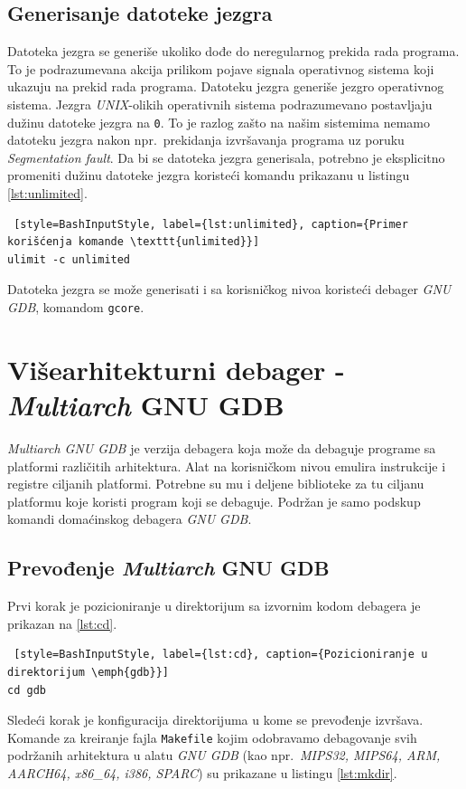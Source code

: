\documentclass[12pt,oneside]{memoir}
\begin{document}
\subsection{Generisanje datoteke jezgra}

Datoteka jezgra se generiše ukoliko dođe do neregularnog prekida rada programa. To je podrazumevana akcija prilikom pojave signala operativnog sistema koji ukazuju na prekid rada programa. Datoteku jezgra generiše jezgro operativnog sistema. Jezgra \emph{UNIX}-olikih operativnih sistema podrazumevano postavljaju dužinu datoteke jezgra na \texttt{0}. To je razlog zašto na našim sistemima nemamo datoteku jezgra nakon npr.~prekidanja izvršavanja programa uz poruku \emph{Segmentation fault}. Da bi se datoteka jezgra generisala, potrebno je eksplicitno promeniti dužinu datoteke jezgra koristeći komandu prikazanu u listingu \ref{lst:unlimited}.

\begin{lstlisting} [style=BashInputStyle, label={lst:unlimited}, caption={Primer korišćenja komande \texttt{unlimited}}]
ulimit -c unlimited

\end{lstlisting}

Datoteka jezgra se može generisati i sa korisničkog nivoa koristeći debager \emph{GNU GDB},  komandom \texttt{gcore}.

\section{Višearhitekturni debager - \emph{Multiarch} GNU GDB}

\emph{Multiarch GNU GDB} je verzija debagera koja može da debaguje programe sa platformi različitih arhitektura. Alat na korisničkom nivou emulira instrukcije i registre ciljanih platformi. Potrebne su mu i deljene biblioteke za tu ciljanu platformu koje koristi program koji se debaguje. Podržan je samo podskup komandi domaćinskog debagera \emph{GNU GDB}.

\subsection{Prevođenje \emph{Multiarch} GNU GDB}

Prvi korak je pozicioniranje u direktorijum sa izvornim kodom debagera je prikazan na \ref{lst:cd}.
\begin{lstlisting} [style=BashInputStyle, label={lst:cd}, caption={Pozicioniranje u direktorijum \emph{gdb}}]
cd gdb
\end{lstlisting}
Sledeći korak je konfiguracija direktorijuma u kome se prevođenje izvršava. Komande za kreiranje fajla \texttt{Makefile} kojim odobravamo debagovanje svih podržanih arhitektura u alatu \emph{GNU GDB} (kao npr.~\emph{MIPS32, MIPS64, ARM, AARCH64, x86\_64, i386, SPARC}) su prikazane u listingu \ref{lst:mkdir}.
\end{document}
